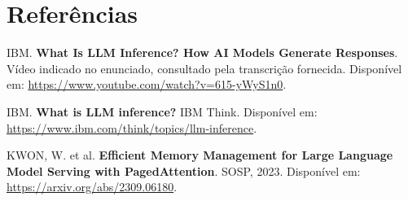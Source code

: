 \documentclass[12pt,a4paper]{article}
\begin{document}
\section*{Referências}

\noindent [1] IBM. \textbf{What Is LLM Inference? How AI Models Generate Responses}. Vídeo indicado no enunciado, consultado pela transcrição fornecida. Disponível em: \url{https://www.youtube.com/watch?v=615-yWyS1n0}.

\noindent [2] IBM. \textbf{What is LLM inference?} IBM Think. Disponível em: \url{https://www.ibm.com/think/topics/llm-inference}.

\noindent [3] KWON, W. et al. \textbf{Efficient Memory Management for Large Language Model Serving with PagedAttention}. SOSP, 2023. Disponível em: \url{https://arxiv.org/abs/2309.06180}.
\end{document}
